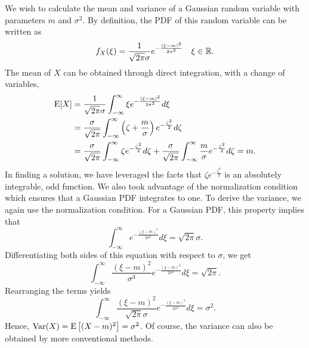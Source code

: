 \begin{example}
We wish to calculate the mean and variance of a Gaussian random variable with parameters $m$ and $\sigma^2$.
By definition, the PDF of this random variable can be written as
\begin{equation*}
f_X (\xi) = \frac{1}{\sqrt{2 \pi} \sigma} e^{-\frac{(\xi - m)^2}{2\sigma^2}}
\quad \xi \in \mathbb{R} .
\end{equation*}
The mean of $X$ can be obtained through direct integration, with a change of variables,
\begin{equation*}
\begin{split}
\mathrm{E} [X]
&= \frac{1}{\sqrt{2 \pi} \sigma} \int_{- \infty}^{\infty} \xi e^{-\frac{(\xi-m)^2}{2\sigma^2}} d\xi \\
&= \frac{\sigma}{\sqrt{2 \pi}} \int_{- \infty}^{\infty}
\left( \zeta+\frac{m}{\sigma} \right) e^{-\frac{\zeta^2}{2}} d\zeta \\
&= \frac{\sigma}{\sqrt{2 \pi}} \int_{- \infty}^{\infty}
\zeta e^{-\frac{\zeta^2}{2}} d\zeta
+ \frac{\sigma}{\sqrt{2 \pi}} \int_{- \infty}^{\infty}
\frac{m}{\sigma} e^{-\frac{\zeta^2}{2}} d\zeta
= m.
\end{split}
\end{equation*}
In finding a solution, we have leveraged the facts that $\zeta e^{-\frac{\zeta^2}{2}}$ is an absolutely integrable, odd function.
We also took advantage of the normalization condition which ensures that a Gaussian PDF integrates to one.
To derive the variance, we again use the normalization condition.
For a Gaussian PDF, this property implies that
\begin{equation*}
\int_{-\infty}^{\infty} e^{- \frac{(\xi-m)^2}{2 \sigma^2}} d\xi
= \sqrt{2 \pi} \sigma .
\end{equation*}
Differentiating both sides of this equation with respect to $\sigma$, we get
\begin{equation*}
\int_{-\infty}^{\infty} \frac{(\xi-m)^2}{\sigma^3}
e^{- \frac{(\xi-m)^2}{2 \sigma^2}} d\xi
= \sqrt{2 \pi} .
\end{equation*}
Rearranging the terms yields
\begin{equation*}
\int_{-\infty}^{\infty} \frac{(\xi-m)^2}{\sqrt{2 \pi} \sigma}
e^{- \frac{(\xi-m)^2}{2 \sigma^2}} d\xi
= \sigma^2 .
\end{equation*}
Hence, $\mathrm{Var}(X) = \mathrm{E} \left[ (X-m)^2 \right] = \sigma^2$.
Of course, the variance can also be obtained by more conventional methods.
\end{example}


